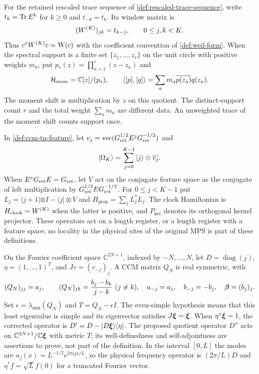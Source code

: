\begin{definition}
\label{def:ccm-tn-moments}
For the retained rescaled trace sequence of
\cref{def:rescaled-trace-sequence}, write $t_k=\operatorname{Tr} E^k$ for $k\geq0$
and $t_{-k}=\overline{t_k}$. Its window matrix is
\[
  (W^{(K)})_{jk}=t_{k-j},\qquad 0\leq j,k<K.
\]
Thus $c^*W^{(K)} c=\mathrm{W}(c)$ with the coefficient convention of
\cref{def:weil-form}. When the spectral support is a finite set
$\{z_1,\ldots,z_r\}$ on the unit circle with positive weights $m_a$,
put $p_*(z)=\prod_{a=1}^r(z-z_a)$ and
\[
 \mathcal H_{\mathrm{mom}}=\mathbb C[z]/(p_*),\qquad
 \langle[p],[q]\rangle=\sum_a m_a\overline{p(z_a)}q(z_a).
\]
The moment shift is multiplication by $z$ on this quotient.
The distinct-support count $r$ and the total weight $\sum_a m_a$ are
different data. An unweighted trace of the moment shift counts support once.
\end{definition}

\begin{definition}
\label{def:ccm-tn-history}
In \cref{def:ccm-tn-feature}, let
$v_j=\operatorname{vec}(G_{\mathrm{ret}}^{1/2}E^jG_{\mathrm{ret}}^{-1/2})$ and
\[
 |\Omega_K\rangle=\sum_{j=0}^{K-1}|j\rangle\otimes\overline{v_j}.
\]
When $E^*G_{\mathrm{ret}} E=G_{\mathrm{ret}}$, let $V$ act on the conjugate feature
space as the conjugate of left multiplication by
$G_{\mathrm{ret}}^{1/2}EG_{\mathrm{ret}}^{-1/2}$. For $0\leq j<K-1$ put
$L_j=\langle j+1|\otimes I-\langle j|\otimes V$ and
$H_{\mathrm{prop}}=\sum_jL_j^*L_j$.
The clock Hamiltonian is $H_{\mathrm{clock}}=W^{(K)}$ when the latter
is positive, and $P_{\ker}$ denotes its orthogonal kernel projector.
These operators act on a length register, or a length register with a
feature space; no locality in the physical sites of the original MPS is
part of these definitions.
\end{definition}

\begin{definition}
\label{def:ccm-tn-loewner}
On the Fourier coefficient space $\mathbb C^{2N+1}$, indexed by
$-N,\ldots,N$, let $D=\operatorname{diag}(j)$,
$\eta=(1,\ldots,1)^T$, and $Jv=(v_{-j})_j$.
A CCM matrix $Q_N$ is real symmetric, with
\[
 (Q_N)_{jj}=a_j,\qquad (Q_N)_{jk}=\frac{b_j-b_k}{j-k}\ (j\ne k),
 \quad a_{-j}=a_j,\quad b_{-j}=-b_j,\quad \boldsymbol{\beta}=(b_j)_j.
\]
Set $\epsilon=\lambda_{\min}(Q_N)$ and $T=Q_N-\epsilon I$.
The even-simple hypothesis means that this least eigenvalue is simple
and its eigenvector satisfies $J\boldsymbol{\xi}=\boldsymbol{\xi}$. When $\eta^*\boldsymbol{\xi}=1$,
the corrected operator is $D'=D-|D\boldsymbol{\xi}\rangle\langle\eta|$.
The proposed quotient operator $D''$ acts on
$\mathbb C^{2N+1}/\mathbb C\boldsymbol{\xi}$ with metric $T$; its well-definedness
and self-adjointness are assertions to prove, not part of the definition.
In the interval $[0,L]$ the modes are
$u_j(x)=L^{-1/2}e^{2\pi ijx/L}$, so the physical frequency operator is
$(2\pi/L)D$ and $\eta^*f=\sqrt L f(0)$ for a truncated Fourier vector.
\end{definition}

